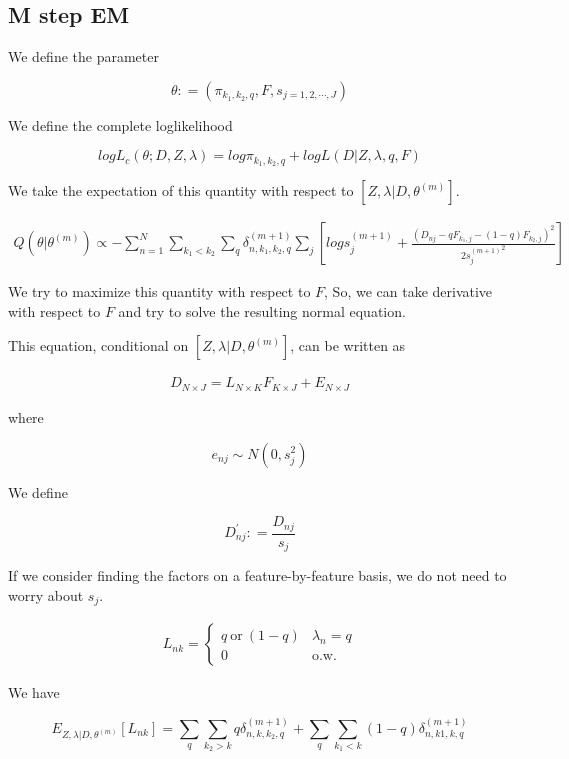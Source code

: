 \documentclass[12pt]{article}
\begin{document}
\subsection{M step EM}


We define the parameter 

$$ \theta : = \left (\pi_{k_1,k_2, q}, F, s_{j=1,2,\cdots,J} \right ) $$

We define the complete loglikelihood 

$$ log L_{c} \left (\theta; D, Z, \lambda \right ) = log \pi_{k_1,k_2, q} + log L (D | Z, \lambda, q, F) $$

We take the expectation of this quantity with respect to $\left [ Z, \lambda | D, \theta^{(m)} \right ]$.

\begin{eqnarray}
 Q (\theta | \theta^{(m)}) \propto - \sum_{n=1}^{N} \sum_{k_1 < k_2} \sum_{q} \delta^{(m+1)}_{n, k_1, k_2, q}  \sum_{j} \left [ log s^{(m+1)}_{j} + \frac{(D_{nj} - q F_{k_1,j} - (1-q) F_{k_2,j})^2}{2{s_j^{(m+1)}}^2} \right]
\end{eqnarray}

We try to maximize this quantity with respect to $F$, So, we can take derivative with respect to $F$ and try to solve the resulting normal equation.

This equation, conditional on $\left [ Z, \lambda | D, \theta^{(m)} \right ]$, can be written as 

\begin{eqnarray}
 D_{N \times J} = L_{N \times K} F_{K \times J} + E_{N \times J}
\end{eqnarray}

where 

$$ e_{nj} \sim N(0, s^2_{j}) $$

We define 

$$ D^{'}_{nj} : = \frac{D_{nj}}{s_{j}} $$

If we consider finding the factors on a feature-by-feature basis, we do not need to worry about $s_j$.

\begin{align*}
L_{nk} =
\begin{cases}
    q~\text{or}~(1-q) & \lambda_{n}=q \\
    0 & \text{o.w.}
\end{cases}
\end{align*}

We have 

$$ E_{ Z, \lambda | D, \theta^{(m)}} \left [ L_{nk} \right ] = \sum_{q}  \sum_{k_2 > k} q \delta^{(m+1)}_{n,k,k_2, q}  + \sum_{q}  \sum_{k_1 < k} (1-q) \delta^{(m+1)}_{n,k1,k,q}$$
\end{document}
